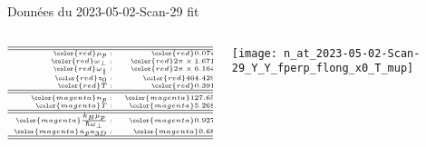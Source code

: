 \begin{frame}[shrink=1]{Données du 2023-05-02-Scan-29  fit }
{	\begin{columns}
	
		\begin{column}{0.3\linewidth}
			$$ 
			{\tiny
			\begin{array}{rrl}
				\hline
				\hline
				{\color{red} \mu_p:}  & {\color{red} 0.074}  & {\color{red} \mu K}\\
				{\color{red}\omega_\perp : } & {\color{red} 2 \pi  \times  1.671} & {\color{red}kHz	}\\
				{\color{red} \omega_\parallel :}  & {\color{red} 2 \pi  \times 6.164}  & {\color{red} Hz	}\\
				{\color{red} z_0 : } & {\color{red} 464.429 }& {\color{red} \mu m	} \\
				{\color{red} T : } & {\color{red} 0.391  } & {\color{red} \mu K}\\			
				\hline
				\hline
				{\color{magenta} n_p :   }& {\color{magenta} 127.65}  & {\color{magenta} {\mu m}^{-1}} \\	
				{\color{magenta} T : } & {\color{magenta} 5.268} & {\color{magenta}\mu_p} \\				
				\hline
				\hline	
				{\color{magenta} \frac{ k_B \mu_p}{\hbar \omega_\perp } : } & {\color{magenta} 0.927}  & 	\\
				{\color{magenta} n_p a_{3D} : }  & {\color{magenta} 0.68}  &  \\
				\hline
				\hline	
			\end{array}
			}
			$$


		\end{column}
		
		\begin{column}{0.7\linewidth}
			\centering
			\texttt{[image: n\_at\_2023-05-02-Scan-29\_Y\_Y\_fperp\_flong\_x0\_T\_mup]}		
		\end{column}

		
	\end{columns}
	}
	
	
\end{frame}
